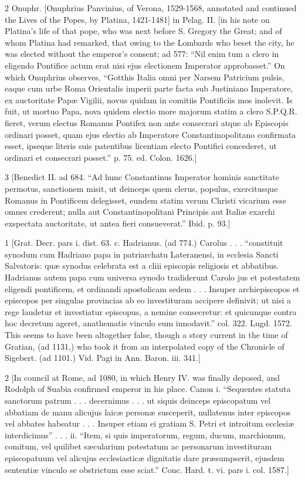 2
Onuphr. [Onuphrius Panvinius, of Verona, 1529-1568, annotated and continued the Lives of the Popes, by Platina, 1421-1481] in Pelag. II. [in his note on Platina’s life of that pope, who was next before S. Gregory the Great; and of whom Platina had remarked, that owing to the Lombards who beset the city, he was elected without the emperor’s consent; ad 577: “Nil enim tum a clero in eligendo Pontifice actum erat nisi ejus electionem Imperator approbasset.” On which Onuphrius observes, “Gotthis Italia omni per Narsem Patricium pulsis, eaque cum urbe Roma Orientalis imperii parte facta sub Justiniano Imperatore, ex auctoritate Papæ Vigilii, novus quidam in comitiis Pontificiis mos inolevit. Is fuit, ut mortuo Papa, nova quidem electio more majorum statim a clero S.P.Q.R. fieret, verum electus Romanus Pontifex non ante consecrari atque ab Episcopis ordinari posset, quam ejus electio ab Imperatore Constantinopolitano confirmata esset, ipseque literis suis patentibus licentiam electo Pontifici concederet, ut ordinari et consecrari posset.” p. 75. ed. Colon. 1626.]

3
[Benedict II. ad 684. “Ad hunc Constantinus Imperator hominis sanctitate permotus, sanctionem misit, ut deinceps quem clerus, populus, exercitusque Romanus in Pontificem delegisset, eundem statim verum Christi vicarium esse omnes crederent; nulla aut Constantinopolitani Principis aut Italiæ exarchi exspectata auctoritate, ut antea fieri consueverat.” Ibid. p. 93.]

1
[Grat. Decr. pars i. dist. 63. c. Hadrianus. (ad 774.) Carolus . . . “constituit synodum cum Hadriano papa in patriarchatu Lateranensi, in ecclesia Sancti Salvatoris: quæ synodus celebrata est a cliii episcopis religiosis et abbatibus. Hadrianus autem papa cum universa synodo tradiderunt Carolo jus et potestatem eligendi pontificem, et ordinandi apostolicam sedem . . . Insuper archiepiscopos et episcopos per singulas provincias ab eo investituram accipere definivit; ut nisi a rege laudetur et investiatur episcopus, a nemine consecretur: et quicunque contra hoc decretum ageret, anathematis vinculo eum innodavit.” col. 322. Lugd. 1572. This seems to have been altogether false, though a story current in the time of Gratian, (ad 1131,) who took it from an interpolated copy of the Chronicle of Sigebert. (ad 1101.) Vid. Pagi in Ann. Baron. iii. 341.]

2
[In council at Rome, ad 1080, in which Henry IV. was finally deposed, and Rodolph of Suabia confirmed emperor in his place. Canon i. “Sequentes statuta sanctorum patrum . . . decernimus . . . ut siquis deinceps episcopatum vel abbatiam de manu alicujus laicæ personæ susceperit, nullatenus inter episcopos vel abbates habeatur . . . Insuper etiam ei gratiam S. Petri et introitum ecclesiæ interdicimus” . . . ii. “Item, si quis imperatorum, regum, ducum, marchionum, comitum, vel quilibet sæcularium potestatum ac personarum investituram episcopatuum vel alicujus ecclesiasticæ dignitatis dare præsumpserit, ejusdem sententiæ vinculo se obstrictum esse sciat.” Conc. Hard. t. vi. pars i. col. 1587.]

